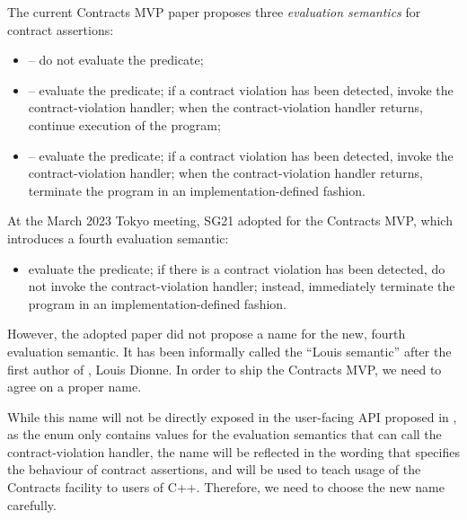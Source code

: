 The current Contracts MVP paper \cite{P2900R6} proposes three \emph{evaluation semantics} for contract assertions:
\begin{itemize}
\item {} – do not evaluate the predicate;
\item {} – evaluate the predicate; if a contract violation has been detected, invoke the contract-violation handler; when the contract-violation handler returns, continue execution of the program;
\item {} – evaluate the predicate; if a contract violation has been detected, invoke the contract-violation handler; when the contract-violation handler returns, terminate the program in an implementation-defined fashion.
\end{itemize}
At the March 2023 Tokyo meeting, SG21 adopted \cite{P3191R0} for the Contracts MVP, which introduces a fourth evaluation semantic:
\begin{itemize}
\item evaluate the predicate; if there is a contract violation has been detected, do not invoke the contract-violation handler; instead, immediately terminate the program in an implementation-defined fashion.
\end{itemize}
However, the adopted paper did not propose a name for the new, fourth evaluation semantic. It has been informally called the ``Louis semantic'' after the first author of \cite{P3191R0}, Louis Dionne. In order to ship the Contracts MVP, we need to agree on a proper name. 

\pagebreak %

While this name will not be directly exposed in the user-facing API proposed in \cite{P2900R6}, as the enum  only contains values for the evaluation semantics that can call the contract-violation handler, the name will be reflected in the wording that specifies the behaviour of contract assertions, and will be used to teach usage of the Contracts facility to users of C++. Therefore, we need to choose the new name carefully.

